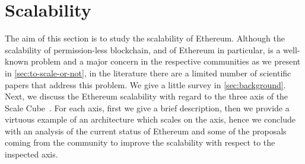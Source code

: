 \section{Scalability}
\label{sec:scalability}

The aim of this section is to study the scalability of Ethereum. Although the
scalability of permission-less blockchain, and of Ethereum in particular, is a
well-known problem and a major concern in the respective communities as we
present in \autoref{sec:to-scale-or-not}, in the literature there are a limited
number of scientific papers that address this problem. We give a little survey
in \autoref{sec:background}. Next, we discuss the Ethereum scalability with
regard to the three axis of the Scale Cube~\cite{bib:art-of-scalability}. For
each axis, first we give a brief description, then we provide a virtuous example
of an architecture which scales on the axis, hence we conclude with an analysis
of the current status of Ethereum and some of the proposals coming from the
community to improve the scalability with respect to the inspected axis.
